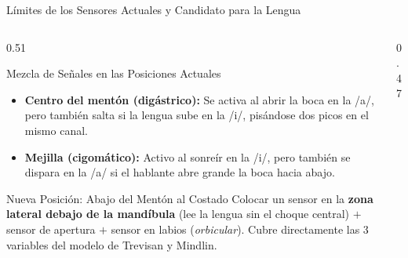 \begin{frame}{Límites de los Sensores Actuales y Candidato para la Lengua}
    \begin{columns}[c]
        \begin{column}{0.51\textwidth}
            \scriptsize
            \begin{alertblock}{Mezcla de Señales en las Posiciones Actuales}
                \begin{itemize}\setlength{\itemsep}{1pt}\setlength{\parskip}{0pt}
                    \item \textbf{Centro del mentón (digástrico):} Se activa al abrir la boca en la /a/, pero también salta si la lengua sube en la /i/, pisándose dos picos en el mismo canal.
                    \item \textbf{Mejilla (cigomático):} Activo al sonreír en la /i/, pero también se dispara en la /a/ si el hablante abre grande la boca hacia abajo.
                \end{itemize}
            \end{alertblock}
            \vspace{0.1cm}
            \begin{exampleblock}{Nueva Posición: Abajo del Mentón al Costado}
                Colocar un sensor en la \textbf{zona lateral debajo de la mandíbula} (lee la lengua sin el choque central) $+$ sensor de apertura $+$ sensor en labios (\textit{orbicular}). Cubre directamente las 3 variables del modelo de Trevisan y Mindlin.
            \end{exampleblock}
        \end{column}
        \begin{column}{0.47\textwidth}
            \centering
        \end{column}
    \end{columns}
\end{frame}
